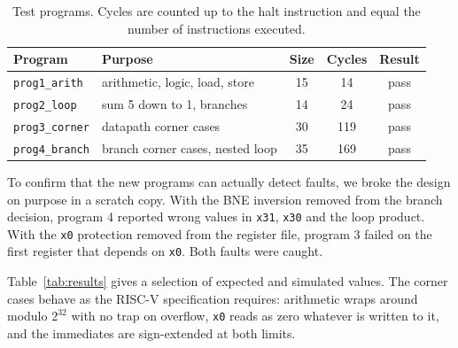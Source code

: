 \documentclass[conference]{IEEEtran}
\begin{document}
\begin{table}[!htb]
\caption{Test programs. Cycles are counted up to the halt instruction and
equal the number of instructions executed.}
\label{tab:programs}
\centering\setlength{\tabcolsep}{4pt}
\begin{tabular}{@{}l>{\raggedright\arraybackslash}p{3.0cm}ccc@{}}
\toprule
Program & Purpose & Size & Cycles & Result \\
\midrule
\texttt{prog1\_arith}  & arithmetic, logic, load, store & 15 & 14  & pass \\
\texttt{prog2\_loop}   & sum 5 down to 1, branches      & 14 & 24  & pass \\
\texttt{prog3\_corner} & datapath corner cases          & 30 & 119 & pass \\
\texttt{prog4\_branch} & branch corner cases, nested loop & 35 & 169 & pass \\
\bottomrule
\end{tabular}
\end{table}

To confirm that the new programs can actually detect faults, we broke the
design on purpose in a scratch copy. With the BNE inversion removed from the
branch decision, program 4 reported wrong values in \texttt{x31},
\texttt{x30} and the loop product. With the \texttt{x0} protection removed
from the register file, program 3 failed on the first register that depends
on \texttt{x0}. Both faults were caught.

Table~\ref{tab:results} gives a selection of expected and simulated values.
The corner cases behave as the RISC-V specification requires: arithmetic
wraps around modulo $2^{32}$ with no trap on overflow, \texttt{x0} reads as
zero whatever is written to it, and the immediates are sign-extended at both
limits.
\end{document}
